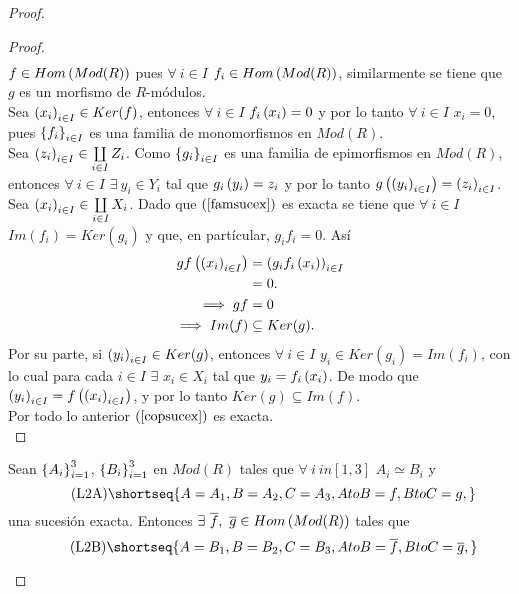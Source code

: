 \documentclass{article}
\begin{document}
\begin{enumerate}[label=\textbf{Ej \arabic*.}]
\begin{proof}
\begin{proof}
\begin{align*}
				\end{align*}
				$f\in Hom\left(Mod(R)\right)$ pues $\forall\ i\in I$ $f_i\in Hom\left(Mod(R)\right)$, similarmente se tiene que $g$ es un morfismo de $R$-módulos.\\
				 Sea ${\left({x}_{i}\right)}_{i\in I}\in Ker(f)$, entonces $\forall\ i\in I$ $f_i \left(x_i\right)=0$ y por lo tanto $\forall\ i\in I$ $x_i=0$, pues ${\left\{{f}_{i}\right\}}_{i\in I}$ es una familia de monomorfismos en $Mod(R)$.\\
				 Sea ${\left({z}_{i}\right)}_{i\in I}\in\coprod\limits_{i\in I}Z_i$. Como ${\left\{{g}_{i}\right\}}_{i\in I}$ es una familia de epimorfismos en $Mod(R)$, entonces $\forall\ i\in I$ $\exists\ y_i\in Y_i$ tal que $g_i \left(y_i\right)=z_i$ y por lo tanto $g\left({\left({y}_{i}\right)}_{i\in I}\right)={\left({z}_{i}\right)}_{i\in I}$.\\
				 Sea ${\left({x}_{i}\right)}_{i\in I}\in \coprod\limits_{i\in I}X_i$. Dado que $\left(\ref{famsucex}\right)$ es exacta se tiene que $\forall\ i\in I$ $Im(f_i)=Ker(g_i)$ y que, en partícular, $g_i f_i=0$. Así
				\begin{align*}
					gf\left({\left({x}_{i}\right)}_{i\in I}\right)&=\left(g_if_i\left(x_i\right)\right)_{i\in I}\\
					&=0.\\
					\implies gf&=0\\
					\implies Im(f)&\subseteq Ker(g).
				\end{align*}
				Por su parte, si ${\left({y}_{i}\right)}_{i\in I}\in Ker(g)$, entonces $\forall\ i\in I$ $y_i\in Ker(g_i)=Im(f_i)$, con lo cual para cada $i\in I$ $\exists$ $x_i\in X_i$ tal que $y_i=f_i \left(x_i\right)$. De modo que ${\left({y}_{i}\right)}_{i\in I}=f\left({\left({x}_{i}\right)}_{i\in I}\right)$, y por lo tanto $Ker(g)\subseteq Im(f)$.\\
				Por todo lo anterior $\left(\ref{copsucex}\right)$ es exacta.\\
			\end{proof}
			\begin{lem}
				Sean ${\left\{{A}_{i}\right\}}_{i=1}^{3}$, ${\left\{{B}_{i}\right\}}_{i=1}^{3}$ en $Mod(R)$ tales que $\forall\ i\ in [1,3]$ $A_i\simeq B_i$ y
				\begin{equation*}\label{sucexbase}\tag{L2A}
					\shortseq{A=A_1,B=A_2,C=A_3,AtoB=f,BtoC=g,}
				\end{equation*} una sucesión exacta. Entonces 
				$\exists\ \overline{f},\ \overline{g}\in Hom\lrprth{Mod(R)}$ tales que
				\begin{equation*}\label{sucexiso}\tag{L2B}
					\shortseq{A=B_1,B=B_2,C=B_3,AtoB=\overline{f},BtoC=\overline{g},}
				\end{equation*}

\end{lem}
\end{proof}
\end{enumerate}
\end{document}
